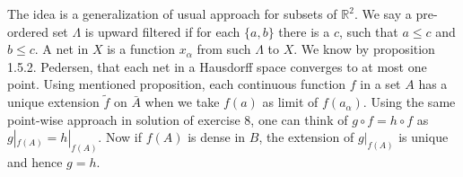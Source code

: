 
The idea is a generalization of usual approach for subsets of $\mathbb{R}^2$. We say a pre-ordered set $\Lambda$ is upward filtered if for each $\{a,b\}$ there is a $c$, such that $a \leq c$ and $b\leq c$. A net in $X$ is a function $x_{\alpha}$ from such $\Lambda$ to $X$. We know by proposition 1.5.2. Pedersen, that each net in a Hausdorff space converges to at most one point. Using mentioned proposition, each continuous function $f$ in a set $A$ has a unique extension $\tilde{f}$ on $\bar{A}$ when we take $f(a)$ as limit of $f(a_{\alpha})$. Using the same point-wise approach in solution of exercise 8, one can think of $g \circ f = h \circ f$ as $g|_{f(A)}=h|_{f(A)}$. Now if $f(A)$ is dense in $B$, the extension of $g|_{f(A)}$ is unique and hence $g=h$.


